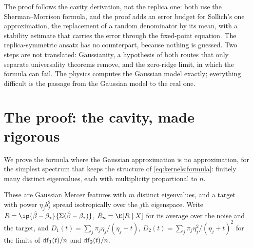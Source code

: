 \begin{refsection}
The proof follows the cavity derivation, not the replica one: both use the Sherman--Morrison formula, and the proof adds an error budget for Sollich's one approximation, the replacement of a random denominator by its mean, with a stability estimate that carries the error through the fixed-point equation. The replica-symmetric ansatz has no counterpart, because nothing is guessed. Two steps are not translated: Gaussianity, a hypothesis of both routes that only separate universality theorems remove, and the zero-ridge limit, in which the formula can fail. The physics computes the Gaussian model exactly; everything difficult is the passage from the Gaussian model to the real one.

\section{The proof: the cavity, made rigorous}\label{sec:kernels:proof}

We prove the formula where the Gaussian approximation is no approximation, for the simplest spectrum that keeps the structure of \eqref{eq:kernels:formula}: finitely many distinct eigenvalues, each with multiplicity proportional to $n$.


These are Gaussian Mercer features with $m$ distinct eigenvalues, and a target with power $\eta_jb_j^2$ spread isotropically over the $j$th eigenspace. Write $R=\ip{\hat\beta-\beta_*}{\Sigma(\hat\beta-\beta_*)}$, $\bar R_n=\E[R\mid X]$ for its average over the noise and the target, and $D_1(t)=\sum_j\pi_j\eta_j/(\eta_j+t)$, $D_2(t)=\sum_j\pi_j\eta_j^2/(\eta_j+t)^2$ for the limits of $\mathrm{df}_1(t)/n$ and $\mathrm{df}_2(t)/n$.


\end{refsection}

